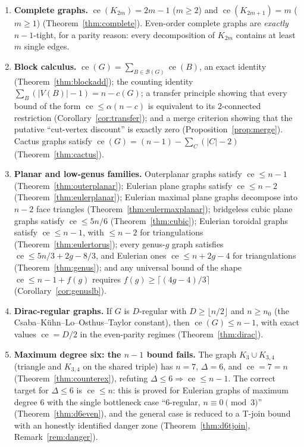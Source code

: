 \documentclass[a4paper,11pt]{amsart}
\theoremstyle{definition}
\theoremstyle{remark}
\newcommand{\ce}{\operatorname{ce}}
\begin{document}
\begin{enumerate}
\item \textbf{Complete graphs.} $\ce(K_{2m})=2m-1$ ($m\ge 2$) and $\ce(K_{2m+1})=m$ ($m\ge 1$)
(Theorem~\ref{thm:complete}). Even-order complete graphs are \emph{exactly} $n-1$-tight, for a parity
reason: every decomposition of $K_{2m}$ contains at least $m$ single edges.
\item \textbf{Block calculus.} $\ce(G)=\sum_{B\in\mathcal{B}(G)}\ce(B)$, an exact identity
(Theorem~\ref{thm:blockadd}); the counting identity $\sum_B(|V(B)|-1)=n-c(G)$; a transfer principle showing
that every bound of the form $\ce\le\alpha(n-c)$ is equivalent to its $2$-connected restriction
(Corollary~\ref{cor:transfer}); and a merge criterion showing that the putative ``cut-vertex discount'' is
exactly zero (Proposition~\ref{prop:merge}). Cactus graphs satisfy
$\ce(G)=(n-1)-\sum_C(|C|-2)$ (Theorem~\ref{thm:cactus}).
\item \textbf{Planar and low-genus families.} Outerplanar graphs satisfy $\ce\le n-1$
(Theorem~\ref{thm:outerplanar}); Eulerian plane graphs satisfy $\ce\le n-2$ (Theorem~\ref{thm:eulerplanar});
Eulerian maximal plane graphs decompose into $n-2$ face triangles (Theorem~\ref{thm:eulermaxplanar});
bridgeless cubic plane graphs satisfy $\ce\le 5n/6$ (Theorem~\ref{thm:cubic}); Eulerian toroidal graphs
satisfy $\ce\le n-1$, with $\le n-2$ for triangulations (Theorem~\ref{thm:eulertorus}); every genus-$g$
graph satisfies $\ce\le 5n/3+2g-8/3$, and Eulerian ones $\ce\le n+2g-4$ for triangulations
(Theorem~\ref{thm:genus}); and any universal bound of the shape $\ce\le n-1+f(g)$ requires
$f(g)\ge\lceil(4g-4)/3\rceil$ (Corollary~\ref{cor:genuslb}).
\item \textbf{Dirac-regular graphs.} If $G$ is $D$-regular with $D\ge\lfloor n/2\rfloor$ and
$n\ge n_0$ (the Csaba--K\"uhn--Lo--Osthus--Taylor constant), then $\ce(G)\le n-1$, with exact values
$\ce=D/2$ in the even-parity regimes (Theorem~\ref{thm:dirac}).
\item \textbf{Maximum degree six: the $n-1$ bound fails.} The graph $K_3\cup K_{3,4}$ (triangle and
$K_{3,4}$ on the shared triple) has $n=7$, $\Delta=6$, and $\ce=7=n$ (Theorem~\ref{thm:counterex}),
refuting $\Delta\le 6\Rightarrow\ce\le n-1$. The correct target for $\Delta\le6$ is $\ce\le n$: this is
proved for Eulerian graphs of maximum degree $6$ with the single bottleneck case ``$6$-regular,
$n\equiv 0 \pmod 3$'' (Theorem~\ref{thm:d6even}), and the general case is reduced to a T-join bound with an
honestly identified danger zone (Theorem~\ref{thm:d6tjoin}, Remark~\ref{rem:danger}).

\end{enumerate}
\end{document}
